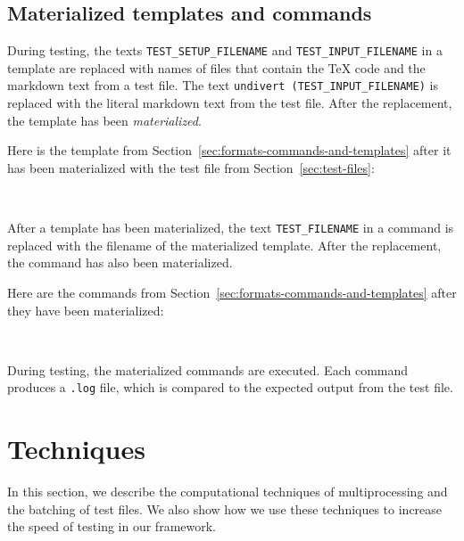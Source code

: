\documentclass[final]{ltugboat}
\begin{document}
\smallskip
\noindent
{}

\smallskip
\exampleSeparator

\smallskip
\noindent
{}

\subsection{Materialized templates and commands}
\label{sec:materialized-templates-and-commands}

During testing, the texts \texttt{TEST\_SETUP\_FILENAME} and \texttt{TEST\_INPUT\_FILENAME} in a template are replaced with names of files that contain the \TeX{} code and the markdown text from a test file. The text \texttt{undivert (TEST\_INPUT\_FILENAME)} is replaced with the literal markdown text from the test file. After the replacement, the template has been \emph{materialized}.

Here is the template  from Section~\ref{sec:formats-commands-and-templates} after it has been materialized with the test file  from Section~\ref{sec:test-files}:

\smallskip
\noindent
{} \\[0.4em]

\smallskip
\exampleSeparator

\smallskip
\noindent
{}

\smallskip

After a template has been materialized, the text \texttt{TEST\_FILENAME} in a command is replaced with the filename of the materialized template. After the replacement, the command has also been materialized.

Here are the commands  from Section~\ref{sec:formats-commands-and-templates} after they have been materialized:

\smallskip
\noindent
{} \\[0.8em]

\smallskip

\noindent
During testing, the materialized commands are executed. Each command produces a \texttt{.log} file, which is compared to the expected output from the test file.

\section{Techniques}
\label{sec:techniques}
In this section, we describe the computational techniques of multiprocessing and the batching of test files. We also show how we use these techniques to increase the speed of testing in our framework.
\end{document}
